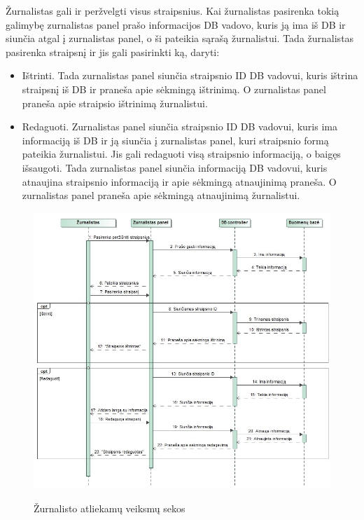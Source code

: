 ﻿\documentclass{VUMIFPSkursinis}
\begin{document}
Žurnalistas gali ir peržvelgti visus straipsnius. Kai žurnalistas pasirenka tokią galimybę zurnalistas panel prašo informacijos DB vadovo, kuris ją ima iš DB ir siunčia atgal į zurnalistas panel, o ši pateikia sąrašą žurnalistui. Tada žurnalistas pasirenka straipsnį ir jis gali pasirinkti ką, daryti:
\begin{itemize}
\item Ištrinti. Tada zurnalistas panel siunčia straipsnio ID DB vadovui, kuris ištrina straipsnį iš DB ir praneša apie sėkmingą ištrinimą. O zurnalistas panel praneša apie straipsio ištrinimą žurnalistui.
\item Redaguoti. Zurnalistas panel siunčia straipsnio ID DB vadovui, kuris ima informaciją iš DB ir ją siunčia į zurnalistas panel, kuri straipsnio formą pateikia žurnalistui. Jis gali redaguoti visą straipsnio informaciją, o baigęs išsaugoti. Tada zurnalistas panel siunčia informaciją DB vadovui, kuris atnaujina straipsnio informaciją ir apie sėkmingą atnaujinimą praneša. O zurnalistas panel praneša apie sėkmingą atnaujinimą žurnalistui.
\end{itemize}	
	
\begin{figure}[H]
    \centering
    \includegraphics[scale=0.5]{img/Pav/ZurnalistasIstrina_Redaguoja}
    \label{img:uml16}
	\caption{Žurnalisto atliekamų veiksmų sekos}
\end{figure}	
	
\end{document}
